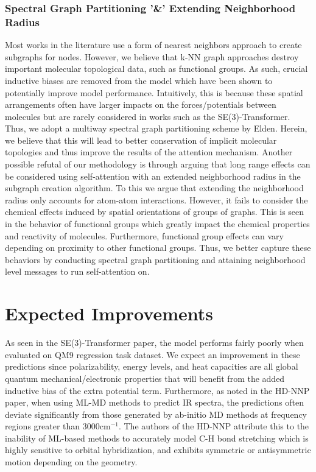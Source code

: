 \documentclass{article}
\begin{document}
\subsubsection{Spectral Graph Partitioning '\&' Extending Neighborhood Radius}
Most works in the literature use a form of nearest neighbors approach to create subgraphs for nodes. However, we believe that k-NN graph approaches destroy important molecular topological data, such as functional groups. As such, crucial inductive biases are removed from the model which have been shown to potentially improve model performance. Intuitively, this is because these spatial arrangements often have larger impacts on the forces/potentials between molecules but are rarely considered in works such as the SE(3)-Transformer. Thus, we adopt a multiway spectral graph partitioning scheme by Elden. Herein, we believe that this will lead to better conservation of implicit molecular topologies and thus improve the results of the attention mechanism. Another possible refutal of our methodology is through arguing that long range effects can be considered using self-attention with an extended neighborhood radius in the subgraph creation algorithm. To this we argue that extending the neighborhood radius only accounts for atom-atom interactions. However, it fails to consider the chemical effects induced by spatial orientations of groups of graphs. This is seen in the behavior of functional groups which greatly impact the chemical properties and reactivity of molecules. Furthermore, functional group effects can vary depending on proximity to other functional groups. Thus, we better capture these behaviors by conducting spectral graph partitioning and attaining neighborhood level messages to run self-attention on.

\section{Expected Improvements}
As seen in the SE(3)-Transformer paper, the model performs fairly poorly when evaluated on QM9 regression task dataset. We expect an improvement in these predictions since polarizability, energy levels, and heat capacities are all global quantum mechanical/electronic properties that will benefit from the added inductive bias of the extra potential term. Furthermore, as noted in the HD-NNP paper, when using ML-MD methods to predict IR spectra, the predictions often deviate significantly from those generated by ab-initio MD methods at frequency regions greater than $3000 \mathrm{cm}^{-1}$. The authors of the HD-NNP attribute this to the inability of ML-based methods to accurately model C-H bond stretching which is highly sensitive to orbital hybridization, and exhibits symmetric or antisymmetric motion depending on the geometry.
\end{document}
